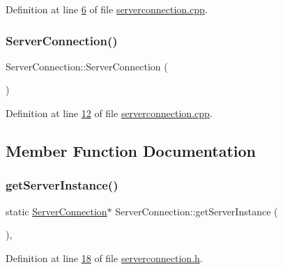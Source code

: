 Definition at line \hyperlink{a00101_source_l00006}{6} of file \hyperlink{a00101_source}{serverconnection.\+cpp}.

\mbox{\label{a00181_a0adf644e7715ddbb83a53651b0804dec}} 
\subsubsection{\texorpdfstring{Server\+Connection()}{ServerConnection()}}
{\footnotesize\ttfamily Server\+Connection\+::\+Server\+Connection (\begin{DoxyParamCaption}{ }\end{DoxyParamCaption})\hspace{0.3cm}{\ttfamily [protected]}}



Definition at line \hyperlink{a00101_source_l00012}{12} of file \hyperlink{a00101_source}{serverconnection.\+cpp}.



\subsection{Member Function Documentation}
\mbox{\label{a00181_ad64d541093e285a983911f22ab9a0bff}} 
\subsubsection{\texorpdfstring{get\+Server\+Instance()}{getServerInstance()}}
{\footnotesize\ttfamily static \hyperlink{a00181}{Server\+Connection}$\ast$ Server\+Connection\+::get\+Server\+Instance (\begin{DoxyParamCaption}{ }\end{DoxyParamCaption})\hspace{0.3cm}{\ttfamily [inline]}, {\ttfamily [static]}}



Definition at line \hyperlink{a00104_source_l00018}{18} of file \hyperlink{a00104_source}{serverconnection.\+h}.

